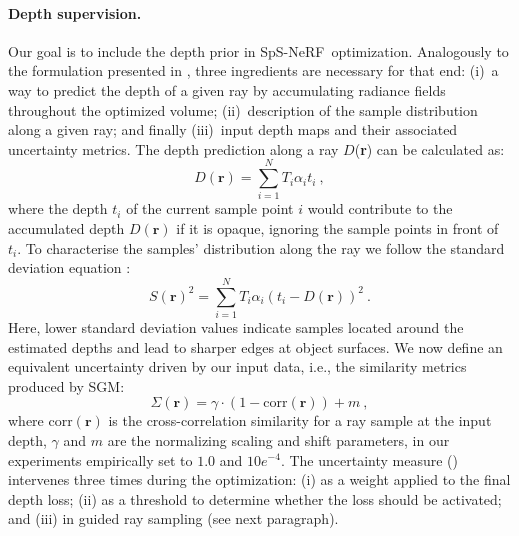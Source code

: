 \documentclass{isprs} %
\newcommand{\OurNeRFShort}{{SpS-NeRF}}
\begin{document}
\paragraph{Depth supervision.} 
Our goal is to include the depth prior in \OurNeRFShort~optimization. Analogously to the formulation presented in \cite{roessle2022dense}, three ingredients are necessary for that end: (i)~a way to predict the depth of a given ray by accumulating radiance fields throughout the optimized volume; (ii)~description of the sample distribution along a given ray; and finally (iii)~input depth maps and their associated uncertainty metrics.
%
The depth prediction along a ray $D$(\textbf{r}) can be calculated as:
\begin{equation}
    {D}(\textbf{r}) = \sum_{i=1}^{N} {T_i {\alpha}_i t_i}~,
    \label{d_r}
\end{equation}
where the depth $t_i$ of the current sample point $i$  would contribute to the accumulated depth  ${D}(\textbf{r})$ if it is opaque, ignoring the sample points in front of $t_i$.
To characterise the samples' distribution along the ray we follow the standard deviation equation \cite{roessle2022dense}: 
\begin{equation}
    S(\textbf{r})^2 = \sum_{i=1}^{N} {T_i {\alpha}_i (t_i - D(\textbf{r}))^2}~.
    \label{d_S}
\end{equation}
%
Here, lower standard deviation values indicate samples located around the estimated depths and lead to sharper edges at object surfaces. We now define an equivalent uncertainty driven by our input data, i.e., the similarity metrics produced by SGM:
\begin{equation}
    \Sigma(\textbf{r}) = \gamma \cdot (1 - \text{corr}(\textbf{r})) + m~,
    \label{s_GT}
\end{equation}
%
where $\text{corr}(\textbf{r})$ is the cross-correlation similarity for a ray sample at the input depth, $\gamma$ and $m$ are the normalizing scaling and shift parameters, in our experiments empirically set to $1.0$ and $10e^{-4}$. The uncertainty measure () intervenes three times during the optimization: (i) as a weight applied to the final depth loss; (ii) as a threshold to determine whether the loss should be activated; and (iii) in guided ray sampling (see next paragraph). 
%
\end{document}
